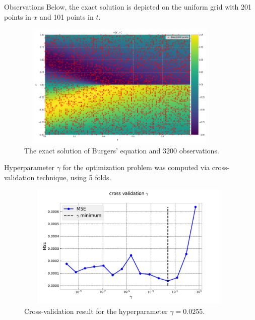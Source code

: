 \documentclass{beamer}
\begin{document}
\begin{frame}{Observations}
\small
Below, the exact solution is depicted on the uniform grid with 201 points in $x$ and 101 points in $t$. 
\begin{figure}
    \centering
    \includegraphics[width=10cm, height=6cm]{images/burgers-exact.png}
    \caption{The exact solution of Burgers' equation and 3200 observations.}
    \label{fig:my_label}
\end{figure}

\end{frame}

\begin{frame}

Hyperparameter $\gamma$ for the optimization problem was computed via cross-validation technique, using 5 folds. 
\begin{figure}
    \centering
    \includegraphics[width=11cm, height=6cm]{images/cross_val_gamma.pdf}
    \caption{Cross-validation result for the hyperparameter $\gamma = 0.0255$.}
    \label{fig:cross_val_gamma}
\end{figure}
    
\end{frame}
\end{document}
